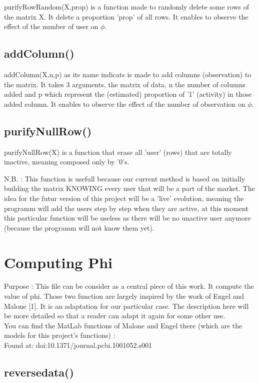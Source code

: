 \documentclass{report}
\begin{document}
purifyRowRandom(X,prop) is a function made to randomly delete some rows of the matrix X. It delete a proportion 'prop' of all rows. It enables to observe the effect of the number of user on $\phi $.

\subsection{addColumn()}

addColumn(X,n,p) as its name indicats is made to add columns (observation) to the matrix. It takes 3 arguments, the matrix of data, n the number of columns added and p which represent the (estimated) proportion of '1' (activity) in those added column. It enables to observe the effect of the number of observation on $\phi $.

\subsection{purifyNullRow()}

purifyNullRow(X) is a function that erase all 'user' (rows) that are totally inactive, meaning composed only by '0's.

N.B. : This function is usefull because our current method is based on initially building the matrix KNOWING every user that will be a part of the market. The idea for the futur version of this project will be a 'live' evolution, meaning the programm will add the users step by step when they are active, at this moment this particular function will be useless as there will be no unactive user anymore (because the programm will not know them yet).


\section{Computing Phi}

Purpose : This file can be consider as a central piece of this work. It compute the value of phi. Those two function are largely inspired by the work of Engel and Malone [1]. It is an adaptation for our particular case. The description here will be more detailed so that a reader can adapt it again for some other use. \\

You can find the MatLab functions of Malone and Engel there (which are the models for this project's functions) : \\
Found at: doi:10.1371/journal.pcbi.1001052.s001

\subsection{reversedata()}
\end{document}
